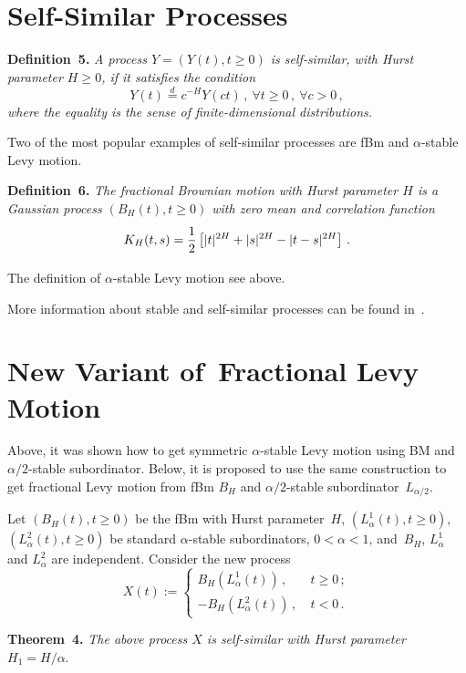 \begin{multicols}{2}
\section{Self-Similar Processes} 


\noindent
\textbf{Definition~5.} 
\textit{A process $Y = (Y(t), t\geq 0)$ is self-similar, with Hurst parameter $H\geq 0$, if it 
satisfies the condition 
$$
Y(t) \stackrel{d}{=} c^{-H} Y(ct)\,, \ \forall t\geq 0\,, \ \forall c>0\,,
$$
where the equality is the sense of finite-dimensional distributions.}

\smallskip

Two of the most popular examples of self-similar processes are 
fBm and $\alpha$-stable Levy motion. 

\smallskip

\noindent
\textbf{Definition~6.}
\textit{The fractional Brownian motion with Hurst parameter $H$ is a Gaussian process 
$(B_H (t), t\geq 0)$ with zero mean and correlation function}
$$
K_H (t,s) = \displaystyle\frac{\displaystyle 1\mathstrut}{\displaystyle 2\mathstrut} \left[ |t|^{2H} + |s|^{2H} - |t-s|^{2H} \right] \,.
$$ 

\smallskip

The definition of $\alpha$-stable Levy motion see above. 

More information about stable and self-similar processes can be found in~\cite{18-nik, 19-nik}. 

\section{New Variant of~Fractional Levy Motion}

\noindent
Above, it was shown  how to get symmetric $\alpha$-stable Levy motion using 
BM and $\alpha/2$-stable subordinator. Below, it is proposed to use the same 
construction to get fractional Levy motion from fBm $B_H$ and 
$\alpha/2$-stable subordinator~$L_{\alpha/2}$. 

Let $(B_H (t), t\geq 0)$ be the fBm with Hurst parameter~$H$,  
$(L_{\alpha}^1 (t), t\geq 0)$, $(L_{\alpha}^2 (t), t\geq 0)$  be standard $\alpha$-stable 
subordinators, $0<\alpha < 1$, and~$B_H$, $L_{\alpha}^1$ and 
$L_{\alpha}^2$ are independent. Consider the new process 
$$
X(t) := 
\begin{cases}
B_H (L_{\alpha}^1 (t))\,, &\ t\geq 0 \,; \\[6pt]
- B_H (L_{\alpha}^2 (t))\,, &\  t < 0 \,. 
\end{cases}
$$

\noindent
\textbf{Theorem~4.} \textit{The above process $X$ is self-similar with Hurst parameter 
$H_1 = H/\alpha$}. 


\end{multicols}
